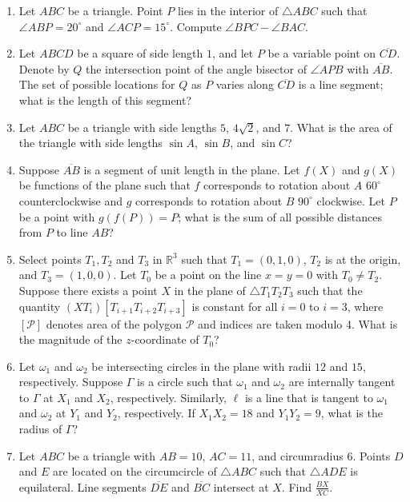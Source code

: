\documentclass[10pt]{article}
\begin{document}
\begin{enumerate}
\item Let $ABC$ be a triangle.  Point $P$ lies in the interior of $\triangle ABC$ such that $\angle ABP = 20^\circ$ and $\angle ACP = 15^\circ$.  Compute $\angle BPC - \angle BAC$.

\item Let $ABCD$ be a square of side length $1$, and let $P$ be a variable point on $\overline{CD}$.  Denote by $Q$ the intersection point of the angle bisector of $\angle APB$ with $\overline{AB}$.  The set of possible locations for $Q$ as $P$ varies along $\overline{CD}$ is a line segment; what is the length of this segment?

\item Let $ABC$ be a triangle with side lengths $5$, $4\sqrt 2$, and $7$.  What is the area of the triangle with side lengths $\sin A$, $\sin B$, and $\sin C$?

\item Suppose $\overline{AB}$ is a segment of unit length in the plane. Let $f(X)$ and $g(X)$ be functions of the plane such that $f$ corresponds to rotation about $A$ $60^\circ$ counterclockwise and $g$ corresponds to rotation about $B$ $90^\circ$ clockwise. Let $P$ be a point with $g(f(P))=P$; what is the sum of all possible distances from $P$ to line $AB$?

\item Select points $T_1,T_2$ and $T_3$ in $\mathbb{R}^3$ such that $T_1=(0,1,0)$, $T_2$ is at the origin, and $T_3=(1,0,0)$. Let $T_0$ be a point on the line $x=y=0$ with $T_0\neq T_2$. Suppose there exists a point $X$ in the plane of $\triangle T_1T_2T_3$ such that the quantity $(XT_i)[T_{i+1}T_{i+2}T_{i+3}]$ is constant for all $i=0$ to $i=3$, where $[\mathcal{P}]$ denotes area of the polygon $\mathcal{P}$ and indices are taken modulo 4.  What is the magnitude of the $z$-coordinate of $T_0$?

\item Let $\omega_1$ and $\omega_2$ be intersecting circles in the plane with radii $12$ and $15$, respectively. Suppose $\Gamma$ is a circle such that $\omega_1$ and $\omega_2$ are internally tangent to $\Gamma$ at $X_1$ and $X_2$, respectively. Similarly, $\ell$ is a line that is tangent to $\omega_1$ and $\omega_2$ at $Y_1$ and $Y_2$, respectively. If $X_1X_2=18$ and $Y_1Y_2=9$, what is the radius of $\Gamma$?

\item Let $ABC$ be a triangle with $AB=10$, $AC=11$, and circumradius $6$.  Points $D$ and $E$ are located on the circumcircle of $\triangle ABC$ such that $\triangle ADE$ is equilateral.  Line segments $\overline{DE}$ and $\overline{BC}$ intersect at $X$.  Find $\frac{BX}{XC}$.


\end{enumerate}
\end{document}
